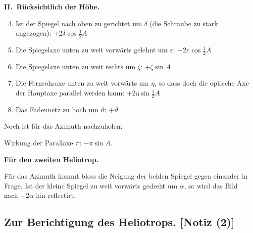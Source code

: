 \documentclass[12pt,a4paper]{article}
\theoremstyle{plain}
\theoremstyle{definition}
\theoremstyle{remark}
\begin{document}
\medskip
\noindent
\textbf{II.\ R\"ucksichtlich der H\"ohe.}
\begin{enumerate}[label=\arabic*.]
\setcounter{enumi}{3}
\item Ist der Spiegel nach oben zu gerichtet um $\delta$ (die Schraube zu stark angezogen): $+2\delta\cos\tfrac{1}{2}A$

\item Die Spiegelaxe unten zu weit vorw\"arts gelehnt um $\varepsilon$: $+2\varepsilon\cos\tfrac{1}{2}A$

\item Die Spiegelaxe unten zu weit rechts um $\zeta$: $+\zeta\sin A$

\item Die Fernrohraxe unten zu weit vorw\"arts um $\eta$, so dass doch die optische Axe der Hauptaxe parallel werden kann: $+2\eta\sin\tfrac{1}{2}A$

\item Das Fadennetz zu hoch um $\vartheta$: $+\vartheta$
\end{enumerate}

Noch ist f\"ur das Azimuth nachzuholen:

Wirkung der Parallaxe $\pi$: $-\pi\sin A$.

\medskip
\noindent
\textbf{F\"ur den zweiten Heliotrop.}

F\"ur das Azimuth kommt bloss die Neigung der beiden Spiegel gegen einander in Frage. Ist der kleine Spiegel zu weit vorw\"arts gedreht um $\alpha$, so wird das Bild nach $-2\alpha$ hin reflectirt.

\subsection*{Zur Berichtigung des Heliotrops. [Notiz (2)]}
\end{document}
